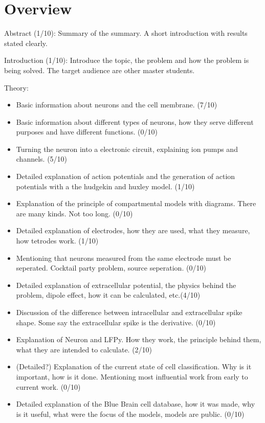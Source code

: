 \documentclass[altfont, fleqn]{uiophd}
\begin{document}
\chapter*{Overview}

Abstract (1/10):
\newline
Summary of the summary. A short introduction with results stated clearly.
\newline

Introduction (1/10):
\newline
Introduce the topic, the problem and how the problem is being solved. 
The target audience are other master students. 
\newline 

Theory:
\begin{itemize}
    \setlength\itemsep{0pt}
    \item Basic information about neurons and the cell membrane. (7/10)
    \item Basic information about different types of neurons, how they serve
        different purposes and have different functions. (0/10)
    \item Turning the neuron into a electronic circuit, explaining ion pumps and 
        channels. (5/10)
    \item Detailed explanation of action potentials and the generation of
        action potentials with a the hudgekin and huxley model. (1/10)
    \item Explanation of the principle of compartmental models with diagrams.
        There are many kinds. Not too long. (0/10)
    \item Detailed explanation of electrodes, how they are used,
        what they measure, how tetrodes work. (1/10)
    \item Mentioning that neurons measured from the same electrode must
        be seperated. Cocktail party problem, source seperation. (0/10)
    \item Detailed explanation of extracellular potential, the physics behind the
        problem, dipole effect, how it can be calculated, etc.(4/10)
    \item Discussion of the difference between intracellular and extracellular 
        spike shape. Some say the extracellular spike is the derivative. (0/10)
    \item Explanation of Neuron and LFPy. How they work, the principle 
        behind them, what they are intended to calculate. (2/10)
    \item (Detailed?) Explanation of the current state of cell classification.
        Why is it important, how is it done. Mentioning most influential 
        work from early to current work. (0/10)
    \item Detailed explanation of the Blue Brain cell database, how it was made, 
        why is it useful, what were the focus of the models, models are public. (0/10)
\end{itemize}
\end{document}
